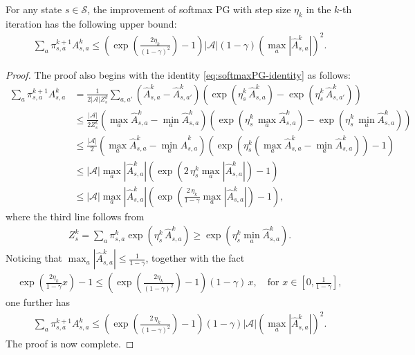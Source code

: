 \begin{lemma}\label{lem:softmaxPG-improvement-upper}
    For any state $s\in\mathcal{S}$, the improvement of softmax PG with step size $\eta_k$ in the $k$-th iteration has the following upper bound:
    \begin{align*}
\sum_a\pi^{k+1}_{s,a}A^k_{s,a}\leq \left(\exp\left(\frac{2\eta_k}{(1-\gamma)^2}\right)-1 \right)|\mathcal{A}|(1-\gamma)\left(\max_a|\hat{A}^k_{s,a}|\right)^2.
\end{align*}
\end{lemma}
\begin{proof}
    The proof also begins with the identity \eqref{eq:softmaxPG-identity} as follows:
\begin{align*}
\sum_a\pi^{k+1}_{s,a}A^k_{s,a} &= \frac{1}{2|\mathcal{A}|Z_s^k}\sum_{a,a'}\left(\hat{A}^k_{s,a}-\hat{A}^k_{s,a'}\right)\left(\exp\left(\eta_s^k\,\hat{A}^k_{s,a}\right)-\exp\left(\eta_s^k\,\hat{A}^k_{s,a'}\right)\right)\\
&\leq \frac{|\mathcal{A}|}{2Z_s^k}\left(\max_a\hat{A}^k_{s,a}-\min_a\hat{A}^k_{s,a}\right)\left(\exp\left(\eta_s^k\,\max_a\hat{A}^k_{s,a}\right)-\exp\left(\eta_s^k\,\min_a\hat{A}^k_{s,a}\right)\right)\\
&\leq \frac{|\mathcal{A}|}{2}\left(\max_a\hat{A}^k_{s,a}-\min_a\hat{A}^k_{s,a}\right)\left(\exp\left(\eta_s^k\left(\max_a\hat{A}^k_{s,a}-\min_a\hat{A}^k_{s,a}\right)\right)-1\right)\\
&\leq  |\mathcal{A}|\max_a|\hat{A}^k_{s,a}| \left(\exp\left(2\,\eta_s^k\max_a|\hat{A}^k_{s,a}|\right)-1\right)\\
& \leq  |\mathcal{A}|\max_a|\hat{A}^k_{s,a}| \left(\exp\left(\frac{2\,\eta_k}{1-\gamma}\max_a|\hat{A}^k_{s,a}|\right)-1\right),
\end{align*}
where the third line follows from
\begin{align*}
Z_s^k=\sum_a \pi_{s,a}^k\exp\left(\eta_s^k\,\hat{A}^k_{s,a}\right)\geq \exp\left(\eta_s^k\min_a\hat{A}^k_{s,a}\right).
\end{align*}
Noticing that $\max_a|\hat{A}^k_{s,a}|\leq \frac{1}{1-\gamma}$, together with the fact
\begin{align*}
\exp\left(\frac{2\eta_k}{1-\gamma}x\right)-1\leq \left(\exp\left(\frac{2\eta_k}{(1-\gamma)^2}\right)-1\right)(1-\gamma)\,x,\quad \mbox{for }x\in\left[0,\frac{1}{1-\gamma}\right],
\end{align*}one further has 
\begin{align*}
\sum_a\pi^{k+1}_{s,a}A^k_{s,a}\leq \left(\exp\left(\frac{2\,\eta_k}{(1-\gamma)^2}\right)-1\right)(1-\gamma)|\mathcal{A}|\left(\max_a|\hat{A}^k_{s,a}|\right)^2.
\end{align*}
The proof is now complete.
\end{proof}
